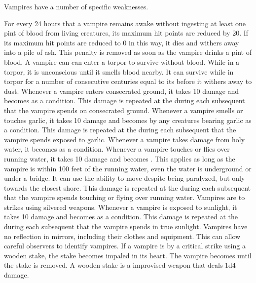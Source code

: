   Vampires have a number of specific weaknesses.
  \begin{raggeditemize}
     For every 24 hours that a vampire remains awake without ingesting at least one pint of blood from living creatures, its maximum hit points are reduced by 20.
      If its maximum hit points are reduced to 0 in this way, it dies and withers away into a pile of ash.
      This penalty is removed as soon as the vampire drinks a pint of blood.
      A vampire can can enter a torpor to survive without blood.
      While in a torpor, it is unconscious until it smells blood nearby.
      It can survive while in torpor for a number of consecutive centuries equal to its  before it withers away to dust.
     Whenever a vampire enters consecrated ground, it takes 10 damage and becomes \stunned as a condition.
      This damage is repeated at the during each subsequent  that the vampire spends on consecrated ground.
     Whenever a vampire smells or touches garlic, it takes 10 damage and becomes \frightened by any creatures bearing garlic as a condition.
      This damage is repeated at the during each subsequent  that the vampire spends exposed to garlic.
     Whenever a vampire takes damage from holy water, it becomes \stunned as a condition.
     Whenever a vampire touches or flies over running water, it takes 10 damage and  becomes \paralyzed.
      This applies as long as the vampire is within 100 feet of the running water, even the water is underground or under a bridge.
      It can use the  ability to move despite being paralyzed, but only towards the closest shore.
      This damage is repeated at the during each subsequent  that the vampire spends touching or flying over running water.
     Vampires are \vulnerable to strikes using silvered weapons.
     Whenever a vampire is exposed to sunlight, it takes 10 damage and becomes \stunned as a condition.
      This damage is repeated at the during each subsequent  that the vampire spends in true sunlight.
     Vampires have no reflection in mirrors, including their clothes and equipment.
      This can allow careful observers to identify vampires.
     If a vampire is  by a critical strike using a wooden stake, the stake becomes impaled in its heart.
      The vampire becomes \paralyzed until the stake is removed.
      A wooden stake is a  improvised weapon that deals 1d4 damage.
  \end{raggeditemize}

